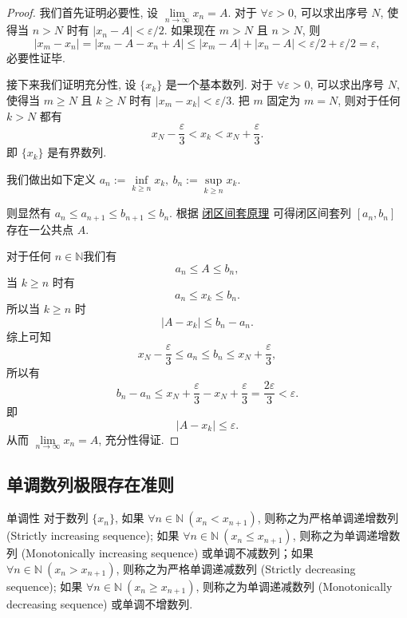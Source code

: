 \documentclass[cn,toc=twocol]{elegantbook}
\newcommand{\N}{\mathbb{N}}
\begin{document}
\begin{proof}
	我们首先证明必要性, 设 $\lim\limits_{n\to\infty} x_n = A$. 对于 $\forall \varepsilon > 0$, 可以求出序号 $N$, 使得当 $n > N$ 时有 $\lvert x_n - A\rvert < \varepsilon/2$. 如果现在 $m > N$ 且 $n > N$, 则 
	\[
		\lvert x_m - x_n \rvert = \lvert x_m - A - x_n + A \rvert \le \lvert x_m - A \rvert + \lvert x_n - A \rvert < \varepsilon/2 + \varepsilon/2 = \varepsilon,
	\]
	必要性证毕.
	
	接下来我们证明充分性, 设 $\{x_k\}$ 是一个基本数列. 对于 $\forall\varepsilon > 0$, 可以求出序号 $N$, 使得当 $m \ge N$ 且 $k\ge N$ 时有 $\lvert x_m - x_k \rvert < \varepsilon/3$. 把 $m$ 固定为 $m = N$, 则对于任何 $k > N$ 都有
	\[
		x_N - \frac\varepsilon3 < x_k < x_N +\frac\varepsilon3.
	\] 
	即 $\{x_k\}$ 是有界数列.
	
	我们做出如下定义 $a_n := \inf\limits_{k \ge n} x_k ,\ b_n := \sup\limits_{k \ge n} x_k$.
	
	则显然有 $a_n \le a_{n+1} \le b_{n+1} \le b_n$. 根据 \hyperref[thm:R2]{闭区间套原理} 可得闭区间套列 $[a_n, b_n]$ 存在一公共点 $A$. 
	
	对于任何 $n \in \N$我们有
	\[
		a_n \le A \le b_n,
	\]
	当 $k \ge n$ 时有
	\[
		a_n \le x_k \le b_n.
	\]	
	所以当 $k \ge n$ 时
	\[
		\lvert A - x_k \rvert \le b_n - a_n.
	\]
	综上可知
	\[
	x_N - \frac{\varepsilon}{3} \le a_n \le b_n \le x_N + \frac{\varepsilon}{3},
	\]
	所以有
	\[
		b_n - a_n \le x_N + \frac{\varepsilon}{3} - x_N + \frac{\varepsilon}{3} = \frac{2\varepsilon}{3} < \varepsilon.
	\]
	即
	\[
		\lvert A - x_k \rvert \le \varepsilon.
	\]
	从而 $\lim\limits_{n\to\infty} x_n = A$, 充分性得证.
	
\end{proof}
\smallskip

\subsection{单调数列极限存在准则}
\begin{definition}{单调性}
	对于数列 $\{x_n\}$, 如果 $\forall n\in\N\ (x_n < x_{n+1})$, 则称之为严格单调递增数列(Strictly increasing sequence); 如果 $\forall n\in\N\ (x_n \le x_{n+1})$, 则称之为单调递增数列 (Monotonically increasing sequence) 或单调不减数列；如果 $\forall n\in\N\ (x_n > x_{n+1})$, 则称之为严格单调递减数列 (Strictly decreasing sequence); 如果 $\forall n\in\N\ (x_n \ge x_{n+1})$, 则称之为单调递减数列 (Monotonically decreasing sequence) 或单调不增数列.
\end{definition}
\end{document}

